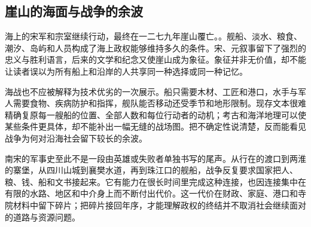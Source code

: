 \subsection{崖山的海面与战争的余波}

海上的宋军和宗室继续行动，最终在一二七九年崖山覆亡。。舰船、淡水、粮食、潮汐、岛屿和人员构成了海上政权能够维持多久的条件。宋、元叙事留下了强烈的忠义与胜利语言，后来的文学和纪念又使崖山成为象征。象征并非无价值，却不能让读者误以为所有船上和沿岸的人共享同一种选择或同一种记忆。

海战也不应被解释为技术优劣的一次展示。船只需要木材、工匠和港口，水手与军人需要食物、疾病防护和指挥，舰队能否移动还受季节和地形限制。现存文本很难精确复原每一艘船的位置、全部人数和每位行动者的动机；考古和海洋地理可以使某些条件更具体，却不能补出一幅无缝的战场图。把不确定性说清楚，反而能看见战争为何对沿海社会留下较长的余波。

南宋的军事史至此不是一段由英雄或失败者单独书写的尾声。从行在的渡口到两淮的寨堡，从四川山城到襄樊水道，再到珠江口的舰船，战争反复要求国家把人、粮、钱、船和文书接起来。它有能力在很长时间里完成这种连接，也因连接集中在有限的水路、地区和中介身上而不断付出代价。这一代价在财政、家庭、港口和寺院材料中留下碎片；把碎片接回年序，才能理解政权的终结并不取消社会继续面对的道路与资源问题。
